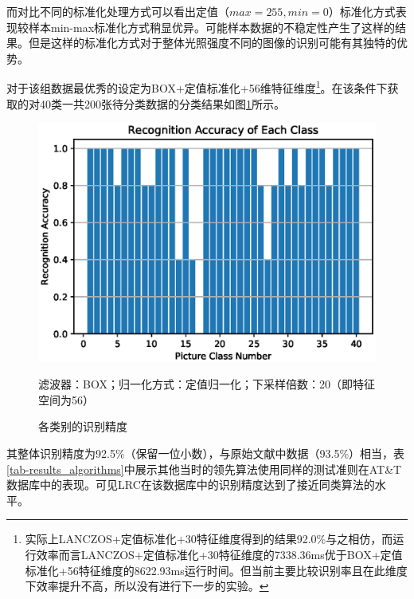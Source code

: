 \documentclass[UTF8]{ctexart}
\begin{document}
而对比不同的标准化处理方式可以看出定值（\(max=255,min=0\)）标准化方式表现较样本min-max标准化方式稍显优异。可能样本数据的不稳定性产生了这样的结果。但是这样的标准化方式对于整体光照强度不同的图像的识别可能有其独特的优势。\par
对于该组数据最优秀的设定为BOX+定值标准化+56维特征维度\footnote{实际上LANCZOS+定值标准化+30特征维度得到的结果92.0\%与之相仿，而运行效率而言LANCZOS+定值标准化+30特征维度的7338.36ms优于BOX+定值标准化+56特征维度的8622.93ms运行时间。但当前主要比较识别率且在此维度下效率提升不高，所以没有进行下一步的实验。}。在该条件下获取的对40类一共200张待分类数据的分类结果如图\ref{fig-result_class_accuracy}所示。\par
\begin{figure}[h]
    \centering
    \includegraphics[scale = 0.6]{RA_Class.eps}
    \caption{各类别的识别精度}{滤波器：BOX；归一化方式：定值归一化；下采样倍数：20（即特征空间为56）}\label{fig-result_class_accuracy}
\end{figure}
其整体识别精度为92.5\%（保留一位小数），与原始文献中数据（93.5\%）相当，表\ref{tab-results_algorithms}中展示其他当时的领先算法使用同样的测试准则在AT\&T数据库中的表现。可见LRC在该数据库中的识别精度达到了接近同类算法的水平。\par
\end{document}
